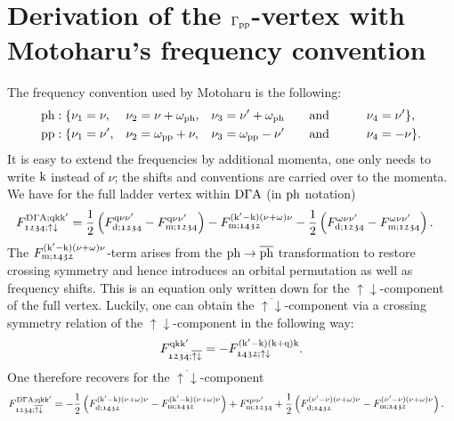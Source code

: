 \documentclass[main.tex]{subfiles}
\begin{document}
\section{Derivation of the $\Gamma_{\text{pp}}$-vertex with Motoharu's frequency convention}

The frequency convention used by Motoharu is the following:
\begin{subequations}
\begin{align}
	&\text{ph}: \{\nu_1=\nu,&&\nu_2=\nu+\omega_{\text{ph}},&&\nu_3=\nu'+\omega_{\text{ph}}\qquad\text{and}\qquad&&\nu_4=\nu' \}, \\
	&\text{pp}: \{\nu_1=\nu',&&\nu_2=\omega_{\text{pp}}+\nu,&&\nu_3=\omega_{\text{pp}}-\nu'\qquad\text{and}\qquad&&\nu_4=-\nu \}.
\end{align}
\end{subequations}
It is easy to extend the frequencies by additional momenta, one only needs to write $\text{k}$ instead of $\nu$; the shifts and conventions are carried over to the momenta. We have for the full ladder vertex \cite{GallerThesis2017, GeorgRohringer2013} within $\text{D}\Gamma\text{A}$ (in $\text{ph}$ notation)
\begin{align}
	F^{\text{D}\Gamma\text{A};\text{q}\text{k}\text{k}'}_{\mathfrak{1234};\uparrow\downarrow}&=\frac12\left (F_{\text{d};\mathfrak{1234}}^{\text{q}\nu\nu'}-F_{\text{m};\mathfrak{1234}}^{\text{q}\nu\nu'}\right )-F_{\text{m};\mathfrak{1432}}^{(\text{k}'-\text{k})(\nu+\omega)\nu}-\frac12\left (F_{\text{d};\mathfrak{1234}}^{\omega\nu\nu'}-F_{\text{m};\mathfrak{1234}}^{\omega\nu\nu'}\right ).
\end{align}
The $F_{\text{m};\mathfrak{1432}}^{(\text{k}'-\text{k})(\nu+\omega)\nu}$-term arises from the $\text{ph}\to\overline{\text{ph}}$ transformation to restore crossing symmetry and hence introduces an orbital permutation as well as frequency shifts. This is an equation only written down for the $\uparrow\downarrow$-component of the full vertex. Luckily, one can obtain the $\overline{\uparrow\downarrow}$-component via a crossing symmetry relation of the $\uparrow\downarrow$-component in the following way:
\begin{align}
	F^{\text{q}\text{k}\text{k}'}_{\mathfrak{1234};\overline{\uparrow\downarrow}}=-F^{(\text{k}'-\text{k})(\text{k}+\text{q})\text{k}}_{\mathfrak{1432};\uparrow\downarrow}.
\end{align}
One therefore recovers for the $\overline{\uparrow\downarrow}$-component
\begin{align}
	F^{\text{D}\Gamma\text{A};\text{q}\text{k}\text{k}'}_{\mathfrak{1234};\overline{\uparrow\downarrow}}&=-\frac12\left (F_{\text{d};\mathfrak{1432}}^{(\text{k}'-\text{k})(\nu+\omega)\nu}-F_{\text{m};\mathfrak{1432}}^{(\text{k}'-\text{k})(\nu+\omega)\nu}\right )+F_{\text{m};\mathfrak{1234}}^{\text{q}\nu\nu'}+\frac12\left (F_{\text{d};\mathfrak{1432}}^{(\nu'-\nu)(\nu+\omega)\nu}-F_{\text{m};\mathfrak{1432}}^{(\nu'-\nu)(\nu+\omega)\nu}\right ).
\end{align}
\end{document}
